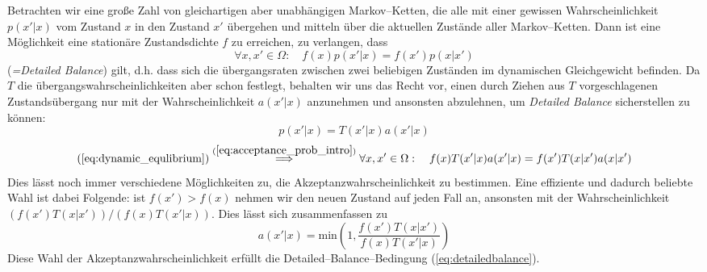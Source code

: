 	Betrachten wir eine große Zahl von gleichartigen aber unabhängigen Markov--Ketten, die alle mit einer gewissen Wahrscheinlichkeit $p(x'|x)$ vom Zustand $x$ in den Zustand $x'$ übergehen und mitteln über die aktuellen Zustände aller Markov--Ketten. Dann ist eine Möglichkeit eine stationäre Zustandsdichte $f$ zu erreichen, zu verlangen, dass
	\begin{equation}
		\forall x,x' \in \Omega :\quad f(x)p(x'|x) = f(x')p(x|x')
		\label{eq:dynamic_equlibrium}
	\end{equation}
	({\em =Detailed Balance}) gilt, d.h. dass sich die übergangsraten zwischen zwei beliebigen Zuständen im dynamischen Gleichgewicht befinden.
	Da $T$ die übergangswahrscheinlichkeiten aber schon festlegt, behalten wir uns das Recht vor, einen durch Ziehen aus $T$ vorgeschlagenen Zustandsübergang nur mit der Wahrscheinlichkeit $a(x'|x)$ anzunehmen und ansonsten abzulehnen,	um {\em Detailed Balance} sicherstellen zu können:
	\begin{equation}
		p(x'|x) = T(x'|x)a(x'|x)
		\label{eq:acceptance_prob_intro}
	\end{equation}
	\begin{equation}
		(\ref{eq:dynamic_equlibrium}) \stackrel{(\ref{eq:acceptance_prob_intro})}{\Longrightarrow}
		\forall x,x' \in \Omega :\quad f(x)T(x'|x)a(x'|x) = f(x')T(x|x')a(x|x')
		\label{eq:detailedbalance}
	\end{equation}
	Dies lässt noch immer verschiedene Möglichkeiten zu, die Akzeptanzwahrscheinlichkeit zu bestimmen. Eine effiziente und dadurch beliebte Wahl ist dabei Folgende: ist $f(x')>f(x)$ nehmen wir den neuen Zustand auf jeden Fall an, ansonsten mit der Wahrscheinlichkeit $(f(x')T(x|x'))/(f(x)T(x'|x))$. Dies lässt sich zusammenfassen zu
	\begin{equation}
		a(x'|x)=\text{min}\left(1,\frac{f(x')T(x|x')}{f(x)T(x'|x)}\right)
		\label{eq:acceptanceratio}
	\end{equation}
	Diese Wahl der Akzeptanzwahrscheinlichkeit erfüllt die Detailed--Balance--Bedingung (\ref{eq:detailedbalance}).
	
	
	
